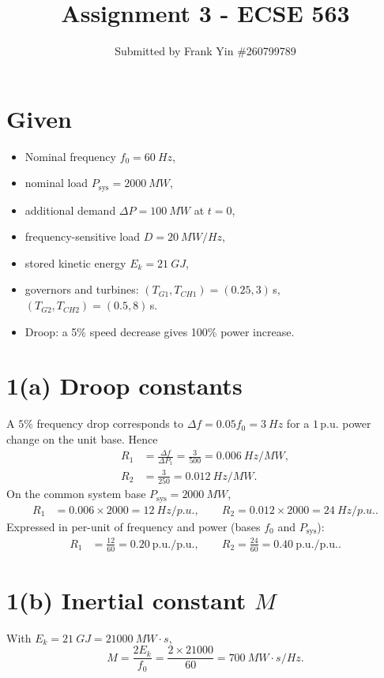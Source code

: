 \documentclass{article}
\title{Assignment 3 - ECSE 563}
\author{Submitted by Frank Yin \#260799789}
\date{}
\begin{document}
\maketitle


\section*{Given}
\begin{itemize}
    \item Nominal frequency $f_0=\SI{60}{Hz}$, 
    \item nominal load $P_{\text{sys}}=\SI{2000}{MW}$, 
    \item additional demand $\Delta P=\SI{100}{MW}$ at $t=0$, 
    \item frequency-sensitive load $D=\SI{20}{MW/Hz}$, 
    \item stored kinetic energy $E_k=\SI{21}{GJ}$, 
    \item governors and turbines: $(T_{G1},T_{CH1})=(0.25,3)\,$s, $(T_{G2},T_{CH2})=(0.5,8)\,$s. 
    \item Droop: a 5\% speed decrease gives 100\% power increase.
\end{itemize}


\section*{1(a) Droop constants}
A $5\%$ frequency drop corresponds to $\Delta f=0.05 f_0=\SI{3}{Hz}$ for a $1$\,p.u. power change on the unit base. Hence
\begin{align*}
R_1 &= \frac{\Delta f}{\Delta P_1} = \frac{3}{500}=\SI{0.006}{Hz/MW},\\
R_2 &= \frac{3}{250}=\SI{0.012}{Hz/MW}.
\end{align*}
On the common system base $P_{\text{sys}}=\SI{2000}{MW}$,
\begin{align*}
R_1 &= 0.006\times2000=\SI{12}{Hz/p.u.},\qquad
R_2 = 0.012\times2000=\SI{24}{Hz/p.u.}.
\end{align*}
Expressed in per-unit of frequency and power (bases $f_0$ and $P_{\text{sys}}$):
\begin{align*}
R_1 &= \frac{12}{60}=0.20~\text{p.u./p.u.},\qquad
R_2 = \frac{24}{60}=0.40~\text{p.u./p.u.}.
\end{align*}

\section*{1(b) Inertial constant $M$}
With $E_k=\SI{21}{GJ}=\SI{21000}{MW\cdot s}$,
\[ M = \frac{2E_k}{f_0} = \frac{2\times21000}{60}=\SI{700}{MW\cdot s/Hz}. \]
\end{document}
